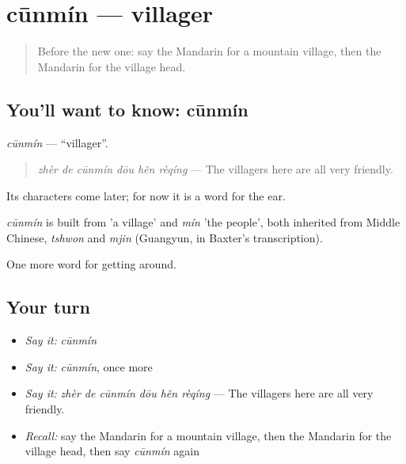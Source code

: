 \section[cūnmín]{cūnmín — villager}

\label{lesson:ZH-C440-cunmin}



\begin{quote}
Before the new one: say the Mandarin for a mountain village, then the Mandarin for the village head.
\end{quote}

\subsection*{You'll want to know: cūnmín}
\emph{cūnmín} — \textquotedblleft{}villager\textquotedblright{}.

\begin{quote}
\emph{zhèr de cūnmín dōu hěn rèqíng} — The villagers here are all very friendly.
\end{quote}

Its characters come later; for now it is a word for the ear.

\begin{cousinweb}
\emph{cūnmín} is built from  'a village' and \emph{mín} 'the people', both inherited from Middle Chinese, \emph{tshwon} and \emph{mjin} (Guangyun, in Baxter's transcription).
\end{cousinweb}

\begin{grammarlens}[title={What you've built}]
One more word for getting around.
\end{grammarlens}

\subsection*{Your turn}
\begin{itemize}
\raggedright
  \item \emph{Say it:} \emph{cūnmín}
  \item \emph{Say it:} \emph{cūnmín}, once more
  \item \emph{Say it:} \emph{zhèr de cūnmín dōu hěn rèqíng} — The villagers here are all very friendly.
  \item \emph{Recall:} say the Mandarin for a mountain village, then the Mandarin for the village head, then say \emph{cūnmín} again
\end{itemize}

